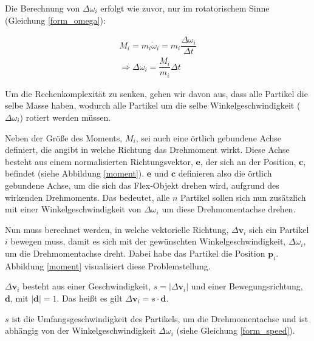 Die Berechnung von $\Delta \omega_i$ erfolgt wie zuvor, nur im rotatorischem Sinne (Gleichung \ref{form_omega}):

\begin{equation}
\begin{split}
M_i = m_i   \dot{\omega}_i = m_i \dfrac{\Delta \omega_i}{\Delta t} \\
\Rightarrow  \Delta \omega_i = \dfrac{M_i}{m_i} \Delta t
\end{split}
\label{form_omega}
\end{equation}

Um die Rechenkomplexität zu senken, gehen wir davon aus, dass alle Partikel die selbe Masse haben, wodurch alle Partikel um die selbe Winkelgeschwindigkeit ($\Delta \omega_i$) rotiert werden müssen. 

Neben der Größe des Moments, $M_i$, sei auch eine örtlich gebundene Achse definiert, die angibt in welche Richtung das Drehmoment wirkt. Diese Achse besteht aus einem normalisierten Richtungsvektor, $\textbf{e}$, der sich an der Position, $\textbf{c}$, befindet (siehe Abbildung \ref{moment}). $\textbf{e}$ und $\textbf{c}$ definieren also die örtlich gebundene Achse, um die sich das Flex-Objekt drehen wird, aufgrund des wirkenden Drehmoments. Das bedeutet, alle $n$ Partikel sollen sich nun zusätzlich mit einer Winkelgeschwindigkeit von $\Delta \omega_i$ um diese Drehmomentachse drehen.

Nun muss berechnet werden, in welche vektorielle Richtung, $\Delta \textbf{v}_i$ sich ein Partikel $i$ bewegen muss, damit es sich mit der gewünschten Winkelgeschwindigkeit, $\Delta \omega_i$, um die Drehmomentachse dreht. Dabei habe das Partikel die Position $\textbf{p}_i$. Abbildung \ref{moment} visualisiert diese Problemstellung.



$\Delta \textbf{v}_i$ besteht aus einer Geschwindigkeit, $s=|\Delta \textbf{v}_i|$ und einer Bewegungsrichtung, $\textbf{d}$, mit $|\textbf{d}|=1$. Das heißt es gilt $\Delta \textbf{v}_i = s \cdot \textbf{d}$.

$s$ ist die Umfangsgeschwindigkeit des Partikels, um die Drehmomentachse und ist abhängig von der Winkelgeschwindigkeit $\Delta \omega_i$ (siehe Gleichung \ref{form_speed}).

